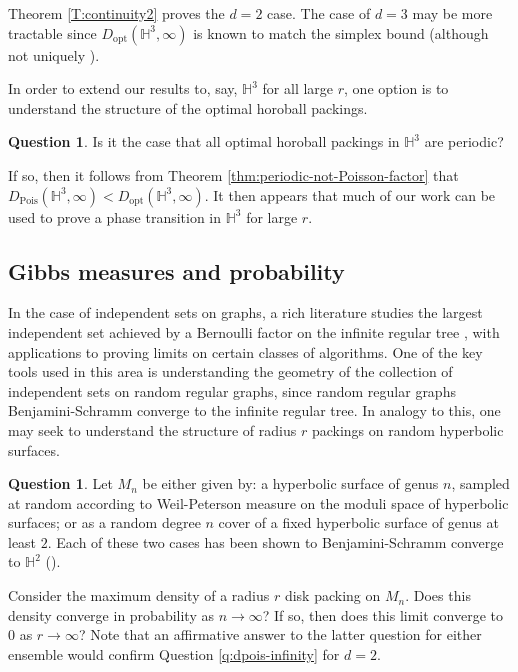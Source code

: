 \documentclass[11pt]{amsart}
\theoremstyle{definition}
\newtheorem{question}[theorem]{Question}
\theoremstyle{remark}
\renewcommand{\H}{\mathbb{H}}
\newcommand{\opt}{\operatorname{opt}}
\newcommand{\Pois}{\operatorname{Pois}}
\newcommand{\Dopt}{D_{\opt}}
\begin{document}
Theorem \ref{T:continuity2} proves the $d = 2$ case.  The case of $d = 3$ may be more tractable since $\Dopt(\H^3,\infty)$ is known \cite{boroczky1978packing} to match the simplex bound (although not uniquely \cite{kozma2012optimally}).

In order to extend our results to, say, $\H^3$ for all large $r$, one option is to understand the structure of the optimal horoball packings. \begin{question}
    Is it the case that all optimal horoball packings in $\H^3$ are periodic?  
\end{question}

If so, then it follows from Theorem \ref{thm:periodic-not-Poisson-factor} that $D_{\Pois}(\H^3,\infty)<D_{\opt}(\H^3,\infty)$.  It then appears that much of our work can be used to prove a phase transition in $\H^3$ for large $r$.


\subsection{Gibbs measures and probability}

In the case of independent sets on graphs, a rich literature studies the largest independent set achieved by a Bernoulli factor on the infinite regular tree \cite{gamarnik2017limits,rahman2017local}, {with applications to proving limits on certain classes of algorithms}.  One of the key tools used in this area is  understanding the geometry of the collection of independent sets on random regular graphs, since random regular graphs Benjamini-Schramm converge to the infinite regular tree.  In analogy to this, one may seek to understand the structure of radius $r$ packings on random hyperbolic surfaces.

\begin{question}
    Let $M_n$ be either given by: a hyperbolic surface of genus $n$, sampled at random according to Weil-Peterson measure on the moduli space of hyperbolic surfaces; or as a random degree $n$ cover of a fixed hyperbolic surface of genus at least $2$.  Each of these two cases has been shown to Benjamini-Schramm converge to $\H^2$ (\cite{monk2022benjamini,magee2023asymptotic}).  
    
    Consider the maximum density of a radius $r$ disk packing on $M_n$.  Does this density converge in probability as {$n \to\infty$}?   If so, then does this limit converge to $0$ as $r \to \infty$? Note that an affirmative answer to the latter question for either ensemble would confirm Question \ref{q:dpois-infinity} for $d = 2$.
\end{question}
\end{document}

